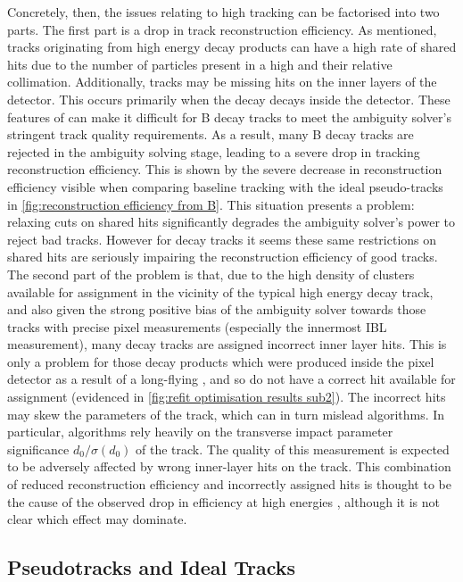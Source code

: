 Concretely, then, the issues relating to high \pT \bhadron tracking can be factorised into two parts. The first part is a drop in track reconstruction efficiency. As mentioned, tracks originating from high energy \bhadron decay products can have a high rate of shared hits due to the number of particles present in a high \pT \bjet and their relative collimation. Additionally, tracks may be missing hits on the inner layers of the detector. This occurs primarily when the decay \bhadron decays inside the detector. These features of can make it difficult for B decay tracks to meet the ambiguity solver's stringent track quality requirements. As a result, many B decay tracks are rejected in the ambiguity solving stage, leading to a severe drop in tracking reconstruction efficiency. This is shown by the severe decrease in reconstruction efficiency visible when comparing baseline tracking with the ideal pseudo-tracks in \cref{fig:reconstruction efficiency from B}. This situation presents a problem: relaxing cuts on shared hits significantly degrades the ambiguity solver's power to reject bad tracks. However for \bhadron decay tracks it seems these same restrictions on shared hits are seriously impairing the reconstruction efficiency of good tracks. The second part of the problem is that, due to the high density of clusters available for assignment in the vicinity of the typical high energy \bhadron decay track, and also given the strong positive bias of the ambiguity solver towards those tracks with precise pixel measurements (especially the innermost IBL measurement), many \bhadron decay tracks are assigned incorrect inner layer hits. This is only a problem for those decay products which were produced inside the pixel detector as a result of a long-flying \bhadron, and so do not have a correct hit available for assignment (evidenced in \cref{fig:refit optimisation results sub2}). The incorrect hits may skew the parameters of the track, which can in turn mislead \btagging algorithms. In particular, \btagging algorithms rely heavily on the transverse impact parameter significance $d_0/\sigma(d_0)$ of the track. The quality of this measurement is expected to be adversely affected by wrong inner-layer hits on the track. This combination of reduced reconstruction efficiency and incorrectly assigned hits is thought to be the cause of the observed drop in \btagging efficiency at high energies , although it is not clear which effect may dominate.


\subsection{Pseudotracks and Ideal Tracks}\label{sec:pseudo ideal tracking}

